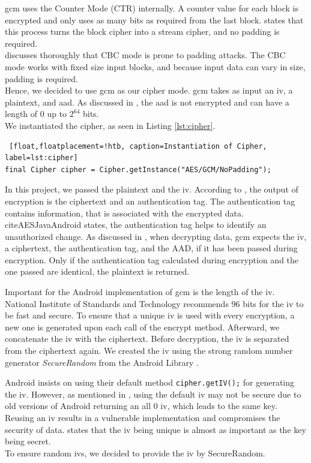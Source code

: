 \gls{gcm} uses the Counter Mode (CTR) internally. A counter value for each block is encrypted and only uses as many bits as required from the last block. \cite{AESJavaAndroid} states that this process turns the block cipher into a stream cipher, and no padding is required. \\
\cite{fedler2013padding} discusses thoroughly that CBC mode is prone to padding attacks. The CBC mode works with fixed size input blocks, and because input data can vary in size, padding is required. \\
Hence, we decided to use \gls{gcm} as our cipher mode. \gls{gcm} takes as input an \gls{iv}, a plaintext, and \gls{aad}. As discussed in \cite{mcgrew2004galois}, the \gls{aad} is not encrypted and can have a length of $0$ up to $2^{64}$ bits. \\
We instantiated the cipher, as seen in Listing \ref{lst:cipher}.

\begin{lstlisting} [float,floatplacement=!htb, caption=Instantiation of Cipher, label=lst:cipher]
final Cipher cipher = Cipher.getInstance("AES/GCM/NoPadding");
\end{lstlisting}

In this project, we passed the plaintext and the \gls{iv}. According to \cite{dworkin2007sp}, the output of encryption is the ciphertext and an authentication tag. The authentication tag contains information, that is associated with the encrypted data. cite{AESJavaAndroid} states, the authentication tag helps to identify an unauthorized change. As discussed in \cite{dworkin2007sp}, when decrypting data, \gls{gcm} expects the \gls{iv}, a ciphertext, the authentication tag, and the AAD, if it has been passed during encryption. Only if the authentication tag calculated during encryption and the one passed are identical, the plaintext is returned.

Important for the Android implementation of \gls{gcm} is the length of the \gls{iv}. National Institute of Standards and Technology \cite{dworkin2007sp} recommends 96 bits for the \gls{iv} to be fast and secure. To ensure that a unique \gls{iv} is used with every encryption, a new one is generated upon each call of the encrypt method. Afterward, we concatenate the \gls{iv} with the ciphertext. Before decryption, the \gls{iv} is separated from the ciphertext again. We created the \gls{iv} using the strong random number generator \textit{SecureRandom} from the Android Library \cite{SecureRandom}.

Android insists on using their default method \texttt{cipher.getIV();} for generating the \gls{iv}. However, as mentioned in \cite{DefaultIV}, using the default \gls{iv} may not be secure due to old versions of Android returning an all $0$ \gls{iv}, which leads to the same key. Reusing an \gls{iv} results in a vulnerable implementation and compromises the security of data. \cite{dworkin2007sp} states that the \gls{iv} being unique is almost as important as the key being secret. \\
To ensure random \glspl{iv}, we decided to provide the \gls{iv} by SecureRandom. 


